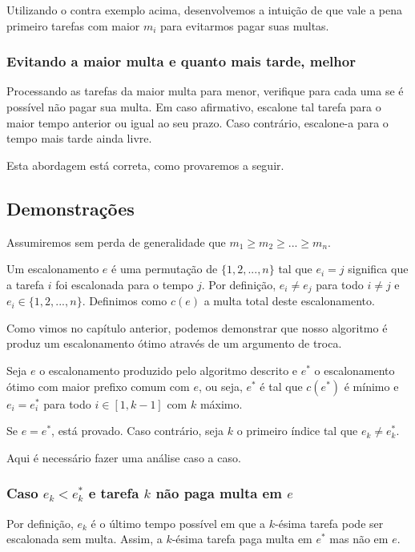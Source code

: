 Utilizando o contra exemplo acima, desenvolvemos a intuição de que vale a pena  primeiro tarefas com maior $m_i$ para evitarmos pagar suas multas.

\subsubsection*{Evitando a maior multa e quanto mais tarde, melhor}

Processando as tarefas da maior multa para menor, verifique para cada uma se é possível não pagar sua multa. Em caso afirmativo, escalone tal tarefa para o maior tempo anterior ou igual ao seu prazo. Caso contrário, escalone-a para o tempo mais tarde ainda livre.

Esta abordagem está correta, como provaremos a seguir.

\subsection*{Demonstrações}

Assumiremos sem perda de generalidade que $m_1 \geq m_2 \geq ... \geq m_n$.

Um escalonamento $e$ é uma permutação de $\{1, 2, ..., n\}$ tal que $e_i = j$ significa que a tarefa $i$ foi escalonada para o tempo $j$. Por definição, $e_i \neq e_j$ para todo $i \neq j$ e $e_i \in \{1, 2, ..., n\}$. Definimos como $c(e)$ a multa total deste escalonamento.

Como vimos no capítulo anterior, podemos demonstrar que nosso algoritmo é produz um escalonamento ótimo através de um argumento de troca.

Seja $e$ o escalonamento produzido pelo algoritmo descrito e $e^*$ o escalonamento ótimo com maior prefixo comum com $e$, ou seja, $e^*$ é tal que $c(e^*)$ é mínimo e $e_i = e^*_i$ para todo $i \in [1, k - 1]$ com $k$ máximo.

Se $e = e^*$, está provado. Caso contrário, seja $k$ o primeiro índice tal que $e_k \neq e^*_k$.

Aqui é necessário fazer uma análise caso a caso.

\subsubsection*{Caso $e_k < e^*_k$ e tarefa $k$ não paga multa em $e$}

Por definição, $e_k$ é o último tempo possível em que a $k$-ésima tarefa pode ser escalonada sem multa. Assim, a $k$-ésima tarefa paga multa em $e^*$ mas não em $e$.

